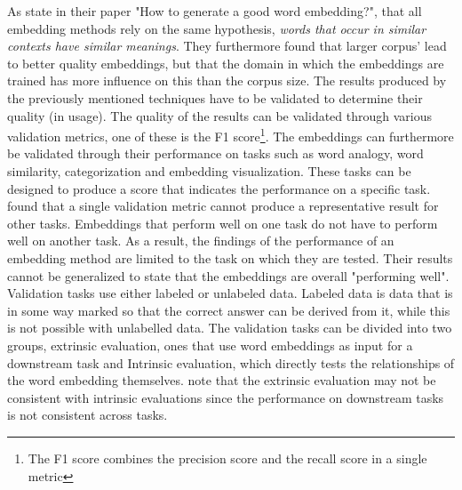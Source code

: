 \documentclass[../../Thesis.tex]{subfiles}
\begin{document}
As \citet{lai2016generate} state in their paper "How to generate a good word embedding?", that all embedding methods rely on the same hypothesis, \textit{words that occur in similar contexts have similar meanings}. They furthermore found that larger corpus' lead to better quality embeddings, but that the domain in which the embeddings are trained has more influence on this than the corpus size. 
The results produced by the previously mentioned techniques have to be validated to determine their quality (in usage). The quality of the results can be validated through various validation metrics, one of these is the F1 score\footnote{The F1 score combines the precision score and the recall score in a single metric}. The embeddings can furthermore be validated through their performance on tasks such as word analogy, word similarity, categorization and embedding visualization. These tasks can be designed to produce a score that indicates the performance on a specific task. \citet{schnabel2015evaluation} found that a single validation metric cannot produce a representative result for other tasks. Embeddings that perform well on one task do not have to perform well on another task. As a result, the findings of the performance of an embedding method are limited to the task on which they are tested. Their results cannot be generalized to state that the embeddings are overall "performing well". Validation tasks use either labeled or unlabeled data. Labeled data is data that is in some way marked so that the correct answer can be derived from it, while this is not possible with unlabelled data. The validation tasks can be divided into two groups, extrinsic evaluation, ones that use word embeddings as input for a downstream task and Intrinsic evaluation, which directly tests the relationships of the word embedding themselves. \citet{schnabel2015evaluation} note that the extrinsic evaluation may not be consistent with intrinsic evaluations since the performance on downstream tasks is not consistent across tasks.
\clearpage
\end{document}

